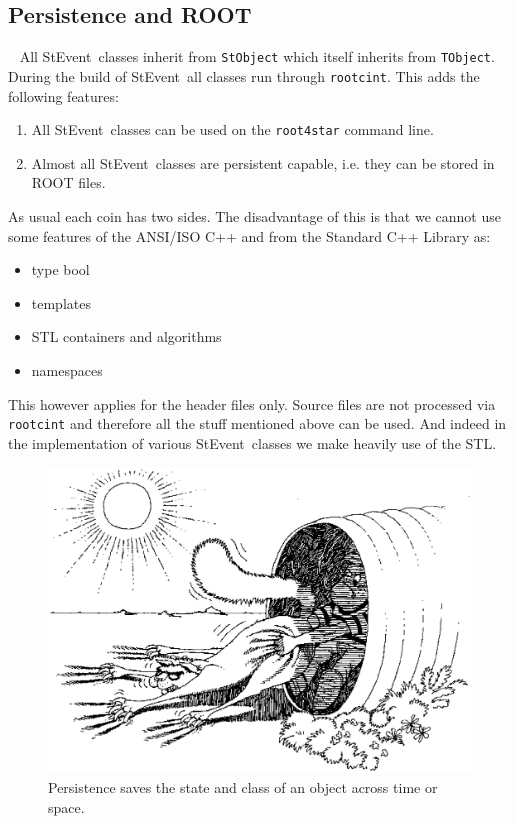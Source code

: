 \documentclass[twoside]{article}
\newcommand{\StEvent}{\textsf{StEvent}}
\begin{document}
\subsection{Persistence and ROOT}
\
\label{sec:Persistence}
  All \StEvent\ classes inherit from
\texttt{StObject} which itself inherits from \texttt{TObject}. During
the build of \StEvent\ all classes run through \texttt{rootcint}. This
adds the following features:
\begin{enumerate}
\item All \StEvent\ classes can be used on the \texttt{root4star}
    command line.
\item Almost all \StEvent\ classes are persistent capable, i.e. they
    can be stored in ROOT files.
\end{enumerate}
As usual each coin has two sides. The disadvantage of this is that we
cannot use some features of the ANSI/ISO C++ and from the Standard C++
Library as:
\begin{itemize}
\item type bool
\item templates
\item STL containers and algorithms
\item namespaces
\end{itemize}
This however applies for the header files only. Source files are not
processed via \texttt{rootcint} and therefore all the stuff mentioned
above can be used.  And indeed in the implementation of various
\StEvent\ classes we make heavily use of the STL.
\begin{figure}[ht]
    \begin{center}
        \includegraphics[width=0.5\textheight]{cartoon4.eps}
        \caption{Persistence saves the state and class of an object
            across time or space.}
    \end{center}
\end{figure}
\end{document}
